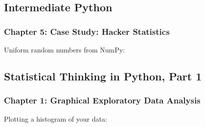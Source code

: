 \documentclass[letterpaper,10pt,english]{jupyterBook}
\begin{document}
\subsection{Intermediate Python}
\label{\detokenize{big-cheat-sheet:intermediate-python}}

\subsubsection{Chapter 5: Case Study: Hacker Statistics}
\label{\detokenize{big-cheat-sheet:chapter-5-case-study-hacker-statistics}}
\sphinxAtStartPar
Uniform random numbers from NumPy:

\begin{sphinxVerbatim}[commandchars=\\\{\}]
    
          \PYG{c+c1}{\PYGZsh{} uniform random in [0,1)}
    
\end{sphinxVerbatim}


\subsection{Statistical Thinking in Python, Part 1}
\label{\detokenize{big-cheat-sheet:statistical-thinking-in-python-part-1}}

\subsubsection{Chapter 1: Graphical Exploratory Data Analysis}
\label{\detokenize{big-cheat-sheet:chapter-1-graphical-exploratory-data-analysis}}
\sphinxAtStartPar
Plotting a histogram of your data:

\begin{sphinxVerbatim}[commandchars=\\\{\}]
   
 \PYG{p}{[}\PYG{p}{]} 
  
  
\end{sphinxVerbatim}
\end{document}

